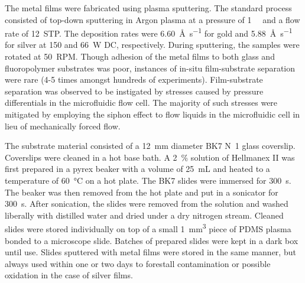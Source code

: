 The metal films were fabricated using plasma sputtering.  The standard
process consisted of top-down sputtering in Argon plasma at a pressure of
\SI{1}{\milli\torr} and a flow rate of \SI{12}{STP}.  The deposition rates
were \SI{6.60}{\angstrom\per\second} for gold and
\SI{5.88}{\angstrom\per\second} for silver at 150 and \SI{66}{\watt} DC,
respectively.  During sputtering, the samples were rotated at \SI{50}{RPM}.
Though adhesion of the metal films to both glass and fluoropolymer
substrates was poor, instances of in-situ film-substrate separation were
rare (4-5 times amongst hundreds of experiments).  Film-substrate
separation was observed to be instigated by stresses caused by pressure
differentials in the microfluidic flow cell.  The majority of such stresses
were mitigated by employing the siphon effect to flow liquids in the
microfluidic cell in lieu of mechanically forced flow.


The substrate material consisted of a \SI{12}{\milli\meter} diameter BK7
N~1 glass coverslip.  Coverslips were
cleaned in a hot base bath.  A \SI{2}{\percent} solution of Hellmanex II
was first prepared in a pyrex beaker with a volume of \SI{25}{\milli\liter}
and heated to a temperature of \SI{60}{\celsius} on a hot plate.  The BK7
slides were immersed for \SI{300}{\second}.  The beaker was then removed
from the hot plate and put in a sonicator for \SI{300}{\second}.  After
sonication, the slides were removed from the solution and washed liberally
with distilled water and dried under a dry nitrogen stream.  Cleaned slides
were stored individually on top of a small \SI{1}{\milli\meter\cubed} piece
of PDMS plasma bonded to a microscope slide. Batches of prepared slides
were kept in a dark box until use.  Slides sputtered with metal films were
stored in the same manner, but always used within one or two days to
forestall contamination or possible oxidation in the case of silver films.

